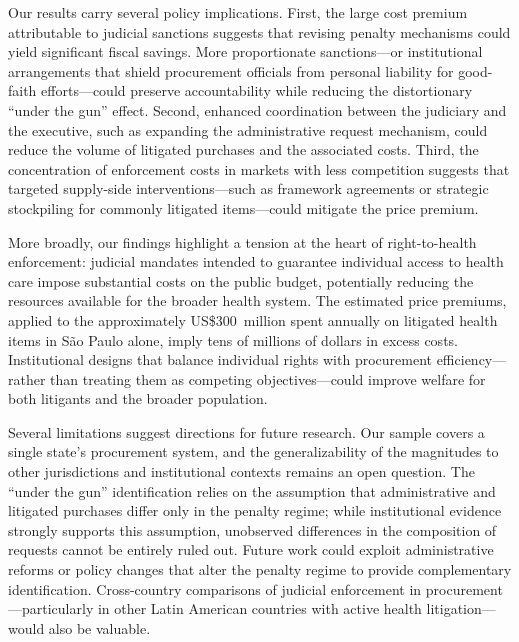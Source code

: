 Our results carry several policy implications. First, the large cost premium attributable to judicial sanctions suggests that revising penalty mechanisms could yield significant fiscal savings. More proportionate sanctions---or institutional arrangements that shield procurement officials from personal liability for good-faith efforts---could preserve accountability while reducing the distortionary ``under the gun'' effect. Second, enhanced coordination between the judiciary and the executive, such as expanding the administrative request mechanism, could reduce the volume of litigated purchases and the associated costs. Third, the concentration of enforcement costs in markets with less competition suggests that targeted supply-side interventions---such as framework agreements or strategic stockpiling for commonly litigated items---could mitigate the price premium.

More broadly, our findings highlight a tension at the heart of right-to-health enforcement: judicial mandates intended to guarantee individual access to health care impose substantial costs on the public budget, potentially reducing the resources available for the broader health system. The estimated price premiums, applied to the approximately US\$300~million spent annually on litigated health items in S\~ao Paulo alone, imply tens of millions of dollars in excess costs. Institutional designs that balance individual rights with procurement efficiency---rather than treating them as competing objectives---could improve welfare for both litigants and the broader population.

Several limitations suggest directions for future research. Our sample covers a single state's procurement system, and the generalizability of the magnitudes to other jurisdictions and institutional contexts remains an open question. The ``under the gun'' identification relies on the assumption that administrative and litigated purchases differ only in the penalty regime; while institutional evidence strongly supports this assumption, unobserved differences in the composition of requests cannot be entirely ruled out. Future work could exploit administrative reforms or policy changes that alter the penalty regime to provide complementary identification. Cross-country comparisons of judicial enforcement in procurement---particularly in other Latin American countries with active health litigation---would also be valuable.
